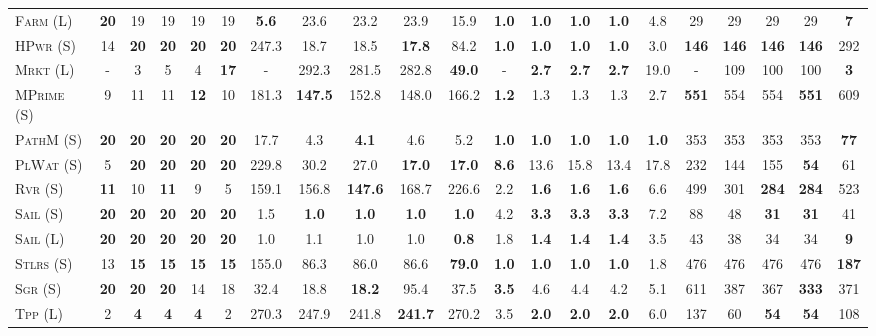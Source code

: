 \begin{table}[tb]
{\begin{tabular}{|l||ccccc||ccccc||ccccc||ccccc||}
\textsc{Farm} (L)&\textbf{20}&19&19&19&19&\textbf{5.6}&23.6&23.2&23.9&15.9&\textbf{1.0}&\textbf{1.0}&\textbf{1.0}&\textbf{1.0}&4.8&29&29&29&29&\textbf{7}\\
\textsc{HPwr} (S)&14&\textbf{20}&\textbf{20}&\textbf{20}&\textbf{20}&247.3&18.7&18.5&\textbf{17.8}&84.2&\textbf{1.0}&\textbf{1.0}&\textbf{1.0}&\textbf{1.0}&3.0&\textbf{146}&\textbf{146}&\textbf{146}&\textbf{146}&292\\
\textsc{Mrkt} (L)&-&3&5&4&\textbf{17}&-&292.3&281.5&282.8&\textbf{49.0}&-&\textbf{2.7}&\textbf{2.7}&\textbf{2.7}&19.0&-&109&100&100&\textbf{3}\\
\textsc{MPrime} (S)&9&11&11&\textbf{12}&10&181.3&\textbf{147.5}&152.8&148.0&166.2&\textbf{1.2}&1.3&1.3&1.3&2.7&\textbf{551}&554&554&\textbf{551}&609\\
\textsc{PathM} (S)&\textbf{20}&\textbf{20}&\textbf{20}&\textbf{20}&\textbf{20}&17.7&4.3&\textbf{4.1}&4.6&5.2&\textbf{1.0}&\textbf{1.0}&\textbf{1.0}&\textbf{1.0}&\textbf{1.0}&353&353&353&353&\textbf{77}\\
\textsc{PlWat} (S)&5&\textbf{20}&\textbf{20}&\textbf{20}&\textbf{20}&229.8&30.2&27.0&\textbf{17.0}&\textbf{17.0}&\textbf{8.6}&13.6&15.8&13.4&17.8&232&144&155&\textbf{54}&61\\
\textsc{Rvr} (S)&\textbf{11}&10&\textbf{11}&9&5&159.1&156.8&\textbf{147.6}&168.7&226.6&2.2&\textbf{1.6}&\textbf{1.6}&\textbf{1.6}&6.6&499&301&\textbf{284}&\textbf{284}&523\\
\textsc{Sail} (S)&\textbf{20}&\textbf{20}&\textbf{20}&\textbf{20}&\textbf{20}&1.5&\textbf{1.0}&\textbf{1.0}&\textbf{1.0}&\textbf{1.0}&4.2&\textbf{3.3}&\textbf{3.3}&\textbf{3.3}&7.2&88&48&\textbf{31}&\textbf{31}&41\\
\textsc{Sail} (L)&\textbf{20}&\textbf{20}&\textbf{20}&\textbf{20}&\textbf{20}&1.0&1.1&1.0&1.0&\textbf{0.8}&1.8&\textbf{1.4}&\textbf{1.4}&\textbf{1.4}&3.5&43&38&34&34&\textbf{9}\\
\textsc{Stlrs} (S)&13&\textbf{15}&\textbf{15}&\textbf{15}&\textbf{15}&155.0&86.3&86.0&86.6&\textbf{79.0}&\textbf{1.0}&\textbf{1.0}&\textbf{1.0}&\textbf{1.0}&1.8&476&476&476&476&\textbf{187}\\
\textsc{Sgr} (S)&\textbf{20}&\textbf{20}&\textbf{20}&14&18&32.4&18.8&\textbf{18.2}&95.4&37.5&\textbf{3.5}&4.6&4.4&4.2&5.1&611&387&367&\textbf{333}&371\\
\textsc{Tpp} (L)&2&\textbf{4}&\textbf{4}&\textbf{4}&2&270.3&247.9&241.8&\textbf{241.7}&270.2&3.5&\textbf{2.0}&\textbf{2.0}&\textbf{2.0}&6.0&137&60&\textbf{54}&\textbf{54}&108\\

\end{tabular}}
\end{table}
